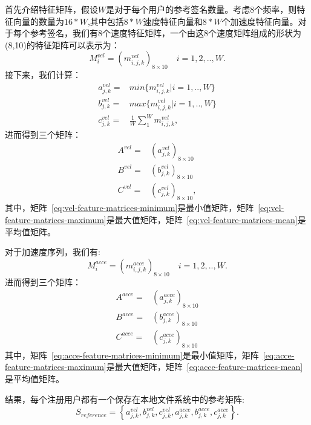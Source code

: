 首先介绍特征矩阵，假设$W$是对于每个用户的参考签名数量。考虑8个频率，则特征向量的数量为$16*W$,其中包括$8*W$速度特征向量和$8*W$个加速度特征向量。对于每个参考签名，我们有8个速度特征矩阵，一个由这8个速度矩阵组成的形状为(8,10)的特征矩阵可以表示为：
$$
M_{i}^{vel}=\left( m^{vel}_{i,j,k}\right)_{8\times10} \quad i=1,2,..,W.
$$
接下来，我们计算：
\begin{align} \nonumber
   a_{j,k}^{vel} =& min\{m^{vel}_{i,j,k}|i=1,..,W\} \\
   b_{j,k}^{vel} =& max\{m^{vel}_{i,j,k}|i=1,..,W\} \\
   c_{j,k}^{vel} =& \frac{1}{W}\sum_{1}^{W}m^{vel}_{i,j,k},
\end{align}
进而得到三个矩阵：
\begin{align}
A^{vel} =& \left(a_{j,k}^{vel}  \right)_{8\times10} \label{eq:vel-feature-matrices-minimum}\\  
B^{vel} =& \left( b_{j,k}^{vel} \right)_{8\times 10} \label{eq:vel-feature-matrices-maximum}\\ 
C^{vel} =& \left( c_{j,k}^{vel} \right)_{8\times 10} ,  \label{eq:vel-feature-matrices-mean}
\end{align}
其中，矩阵~\ref{eq:vel-feature-matrices-minimum}是最小值矩阵，矩阵~\ref{eq:vel-feature-matrices-maximum}是最大值矩阵，矩阵~\ref{eq:vel-feature-matrices-mean}是平均值矩阵。

对于加速度序列，我们有:
$$
M_{i}^{acce}=\left( m^{acce}_{i,j,k}\right)_{8\times10} \quad i=1,2,..,W.
$$
进而得到三个矩阵：
\begin{align}
A^{acce} =& \left(a_{j,k}^{acce}  \right)_{8\times10}  \label{eq:acce-feature-matrices-minimum} \\
B^{acce} =& \left( b_{j,k}^{acce} \right)_{8\times10}  \label{eq:acce-feature-matrices-maximum} \\
C^{acce} =& \left( c_{j,k}^{acce} \right)_{8\times 10} \label{eq:acce-feature-matrices-mean}
\end{align}
其中，矩阵~\ref{eq:acce-feature-matrices-minimum}是最小值矩阵，矩阵~\ref{eq:acce-feature-matrices-maximum}是最大值矩阵，矩阵~\ref{eq:acce-feature-matrices-mean}是平均值矩阵。

结果，每个注册用户都有一个保存在本地文件系统中的参考矩阵:
$$
S_{reference}=\left\{ a_{j,k}^{vel},b_{j,k}^{vel},c_{j,k}^{vel},a_{j,k}^{acce},b_{j,k}^{acce},c_{j,k}^{acce} \right\}.
$$

